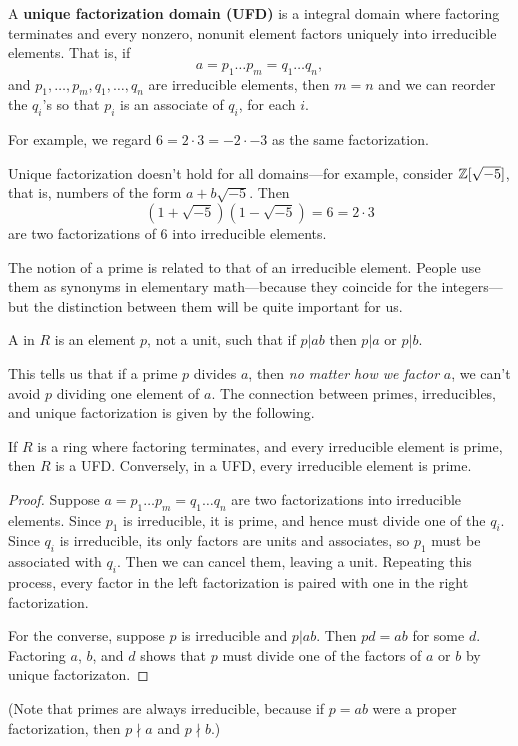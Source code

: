 \begin{df}
A \textbf{unique factorization domain (UFD)} is a integral domain where factoring terminates and every nonzero, nonunit element factors uniquely into irreducible elements. That is, if 
\[
a=p_1\ldots p_m=q_1\ldots q_n,
\]
and $p_1,\ldots, p_m,q_1,\ldots, q_n$ are irreducible elements, then $m=n$ and we can reorder the $q_i$'s so that $p_i$ is an associate of $q_i$, for each $i$.
\end{df}
For example, we regard $6=2\cdot 3=-2\cdot -3$ as the same factorization.

Unique factorization doesn't hold for all domains---for example, consider $\mathbb{Z}[\sqrt{-5}]$, that is, numbers of the form $a+b\sqrt{-5}$. Then
\[
(1+\sqrt{-5})(1-\sqrt{-5})=6=2\cdot 3
\]
are two factorizations of 6 into irreducible elements. 

The notion of a prime is related to that of an irreducible element. People use them as synonyms in elementary math---because they coincide for the integers---but the distinction between them will be quite important for us.
\begin{df}
A  in $R$ is an element $p$, not a unit, such that if $p|ab$ then $p|a$ or $p|b$.
\end{df}
This tells us that if a prime $p$ divides $a$, then {\it no matter how we factor }$a$, we can't avoid $p$ dividing one element of $a$. The connection between primes, irreducibles, and unique factorization is given by the following.
\begin{lem}
If $R$ is a ring where factoring terminates, and every irreducible element is prime, then $R$ is a UFD. Conversely, in a UFD, every irreducible element is prime.
\end{lem}
\begin{proof}
Suppose $a=p_1\ldots p_m=q_1\ldots q_n$ are two factorizations into irreducible elements. Since $p_1$ is irreducible, it is prime, and hence must divide one of the $q_i$. Since $q_i$ is irreducible, its only factors are units and associates, so $p_1$ must be associated with $q_i$. Then we can cancel them, leaving a unit. Repeating this process, every factor in the left factorization is paired with one in the right factorization.

For the converse, suppose $p$ is irreducible and $p|ab$. Then $pd=ab$ for some $d$. Factoring $a$, $b$, and $d$ shows that $p$ must divide one of the factors of $a$ or $b$ by unique factorizaton.
\end{proof}
(Note that primes are always irreducible, because if $p=ab$ were a proper factorization, then $p\nmid a$ and $p\nmid b$.)

